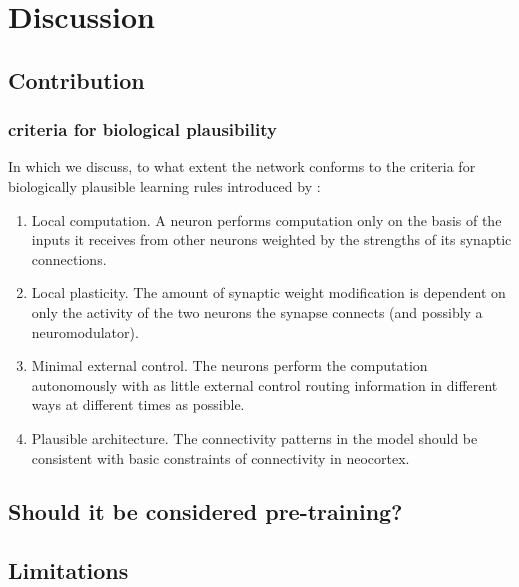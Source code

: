
\chapter{Discussion}


\section{Contribution}




\subsection{criteria for biological plausibility}

In which we discuss, to what extent the network conforms to the criteria for biologically plausible learning rules
introduced by \cite{Whittington2017}:
\begin{enumerate}
      \item Local computation. A neuron performs computation only on the basis
            of the inputs it receives from other neurons weighted by the strengths
            of its synaptic connections.
      \item  Local plasticity. The amount of synaptic weight modification is dependent on only the activity of the two
            neurons the synapse connects (and possibly a neuromodulator).
      \item  Minimal external control. The neurons perform the computation autonomously with as little external control
            routing information in different ways at different times as possible.
      \item   Plausible architecture. The connectivity patterns in the model should
            be consistent with basic constraints of connectivity in neocortex.
\end{enumerate}




\section{Should it be considered pre-training?}






\section{Limitations}


